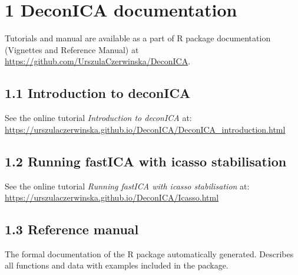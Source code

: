 \documentclass[12pt,]{book}
\theoremstyle{definition}
\theoremstyle{definition}
\theoremstyle{definition}
\theoremstyle{remark}
\begin{document}

\hypertarget{deconica-documentation}{%
\section*{1 DeconICA documentation}\label{deconica-documentation}}

Tutorials and manual are available as a part of R package documentation
(Vignettes and Reference Manual) at
\url{https://github.com/UrszulaCzerwinska/DeconICA}.

\hypertarget{introduction-to-deconica}{%
\subsection*{1.1 Introduction to
deconICA}\label{introduction-to-deconica}}

See the online tutorial \emph{Introduction to deconICA} at:
\url{https://urszulaczerwinska.github.io/DeconICA/DeconICA_introduction.html}

\newpage

\hypertarget{running-fastica-with-icasso-stabilisation}{%
\subsection*{1.2 Running fastICA with icasso
stabilisation}\label{running-fastica-with-icasso-stabilisation}}

See the online tutorial \emph{Running fastICA with icasso stabilisation}
at: \url{https://urszulaczerwinska.github.io/DeconICA/Icasso.html}



\newpage

\hypertarget{reference-manual}{%
\subsection*{1.3 Reference manual}\label{reference-manual}}

The formal documentation of the R package automatically generated.
Describes all functions and data with examples included in the package.
\end{document}
